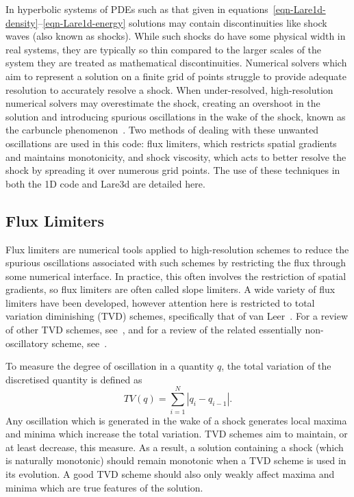 In hyperbolic systems of PDEs such as that given in equations~\eqref{eqn-Lare1d-density}--\eqref{eqn-Lare1d-energy} solutions may contain discontinuities like shock waves (also known as shocks). While such shocks do have some physical width in real systems, they are typically so thin compared to the larger scales of the system they are treated as mathematical discontinuities. Numerical solvers which aim to represent a solution on a finite grid of points struggle to provide adequate resolution to accurately resolve a shock. When under-resolved, high-resolution numerical solvers may overestimate the shock, creating an overshoot in the solution and introducing spurious oscillations in the wake of the shock, known as the carbuncle phenomenon~\cite{rodionovArtificialViscosityCure2019}. Two methods of dealing with these unwanted oscillations are used in this code: flux limiters, which restricts spatial gradients and maintains monotonicity, and shock viscosity, which acts to better resolve the shock by spreading it over numerous grid points. The use of these techniques in both the 1D code and Lare3d are detailed here.

\subsection{Flux Limiters}
\label{sec-flux-limiters}

Flux limiters are numerical tools applied to high-resolution schemes to reduce the spurious oscillations associated with such schemes by restricting the flux through some numerical interface. In practice, this often involves the restriction of spatial gradients, so flux limiters are often called slope limiters. A wide variety of flux limiters have been developed, however attention here is restricted to total variation diminishing (TVD) schemes, specifically that of van Leer~\cite{vanleerUltimateConservativeDifference1997}. For a review of other TVD schemes, see~\cite{zhangReviewTVDSchemes2015}, and for a review of the related essentially non-oscillatory scheme, see~\cite{shuHighOrderENO1999a}. 

To measure the degree of oscillation in a quantity $q$, the total variation of the discretised quantity is defined as
\begin{equation}
  \label{eq:total_variation}
TV(q) = \sum_{i=1}^{N} | q_i - q_{i-1} |.
\end{equation}
Any oscillation which is generated in the wake of a shock generates local maxima and minima which increase the total variation. TVD schemes aim to maintain, or at least decrease, this measure. As a result, a solution containing a shock (which is naturally monotonic) should remain monotonic when a TVD scheme is used in its evolution. A good TVD scheme should also only weakly affect maxima and minima which are true features of the solution.

